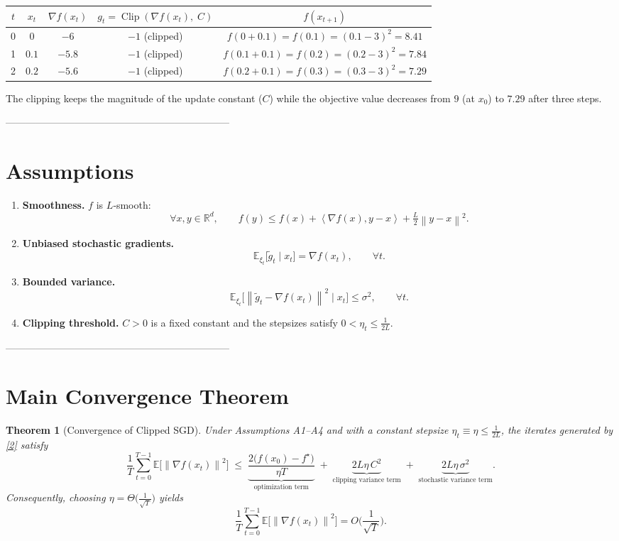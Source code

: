 \documentclass{article}
\newtheorem{theorem}{Theorem}
\newcommand{\clip}[2]{\operatorname{Clip}\!\left(#1,\;#2\right)}
\newcommand{\E}{\mathbb{E}}
\newcommand{\norm}[1]{\left\|#1\right\|}
\newcommand{\inner}[2]{\left\langle #1,#2\right\rangle}
\newcommand{\R}{\mathbb{R}}
\begin{document}
\begin{center}
\begin{tabular}{c|c|c|c|c}
$t$ & $x_t$ & $\nabla f(x_t)$ & $g_t=\clip{\nabla f(x_t)}{C}$ & $f(x_{t+1})$\\\hline
0 & $0$ & $-6$ & $-1$ (clipped) & $f(0+0.1)=f(0.1)= (0.1-3)^2=8.41$\\
1 & $0.1$ & $-5.8$ & $-1$ (clipped) & $f(0.1+0.1)=f(0.2)= (0.2-3)^2=7.84$\\
2 & $0.2$ & $-5.6$ & $-1$ (clipped) & $f(0.2+0.1)=f(0.3)= (0.3-3)^2=7.29$
\end{tabular}
\end{center}
The clipping keeps the magnitude of the update constant ($C$) while the objective value
decreases from $9$ (at $x_0$) to $7.29$ after three steps.

--------------------------------------------------------------------
\section*{Assumptions}
\begin{enumerate}[label={A\arabic*}.]
\item \textbf{Smoothness.} $f$ is $L$‑smooth:
\[
\forall x,y\in\R^{d},\qquad 
f(y)\le f(x)+\inner{\nabla f(x)}{y-x}+\tfrac{L}{2}\norm{y-x}^{2}.
\tag{A1}
\]
\item \textbf{Unbiased stochastic gradients.}
\[
\E_{\xi_t}\!\big[\tilde g_t\mid x_t\big]=\nabla f(x_t),\qquad
\forall t.
\tag{A2}
\]
\item \textbf{Bounded variance.}
\[
\E_{\xi_t}\!\big[\norm{\tilde g_t-\nabla f(x_t)}^{2}\mid x_t\big]\le\sigma^{2},
\qquad\forall t.
\tag{A3}
\]
\item \textbf{Clipping threshold.}
$C>0$ is a fixed constant and the stepsizes satisfy $0<\eta_t\le \frac{1}{2L}$.
\end{enumerate}

--------------------------------------------------------------------
\section*{Main Convergence Theorem}
\begin{theorem}[Convergence of Clipped SGD]\label{thm:main}
Under Assumptions A1–A4 and with a constant stepsize $\eta_t\equiv\eta\le\frac{1}{2L}$,
the iterates generated by \eqref{2} satisfy
\[
\frac{1}{T}\sum_{t=0}^{T-1}\E\!\big[\norm{\nabla f(x_t)}^{2}\big]
\;\le\;
\underbrace{\frac{2\big(f(x_0)-f^{\star}\big)}{\eta T}}_{\text{optimization term}}
\;+\;
\underbrace{2L\eta\,C^{2}}_{\text{clipping variance term}}
\;+\;
\underbrace{2L\eta\,\sigma^{2}}_{\text{stochastic variance term}} .
\tag{3}
\]
Consequently, choosing $\eta = \Theta\!\big(\tfrac{1}{\sqrt{T}}\big)$ yields
\[
\frac{1}{T}\sum_{t=0}^{T-1}\E\!\big[\norm{\nabla f(x_t)}^{2}\big]
= O\!\Big(\frac{1}{\sqrt{T}}\Big).
\]
\end{theorem}
\end{document}
